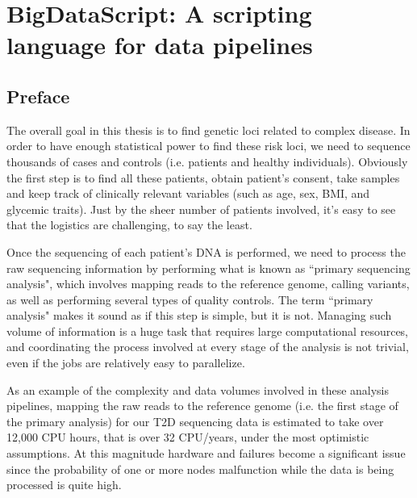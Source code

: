 
\chapter{BigDataScript: A scripting language for data pipelines \label{ch:bds}}

\section{Preface}

The overall goal in this thesis is to find genetic loci related to complex disease. In order to have enough statistical power to find these risk loci, we need to sequence thousands of cases and controls (i.e. patients and healthy individuals). Obviously the first step is to find all these patients, obtain patient’s consent, take samples and keep track of clinically relevant variables (such as age, sex, BMI, and glycemic traits). Just by the sheer number of patients involved, it’s easy to see that the logistics are challenging, to say the least. 

Once the sequencing of each patient’s DNA is performed, we need to process the raw sequencing information by performing what is known as ``primary sequencing analysis", which involves mapping reads to the reference genome, calling variants, as well as performing several types of quality controls. The term ``primary analysis" makes it sound as if this step is simple, but it is not. Managing such volume of information is a huge task that requires large computational resources, and coordinating the process involved at every stage of the analysis is not trivial, even if the jobs are relatively easy to parallelize. 

As an example of the complexity and data volumes involved in these analysis pipelines, mapping the raw reads to the reference genome (i.e. the first stage of the primary analysis) for our T2D sequencing data is estimated to take over 12,000 CPU hours, that is over 32 CPU/years, under the most optimistic assumptions. At this magnitude hardware and failures become a significant issue since the probability of one or more nodes malfunction while the data is being processed is quite high.

